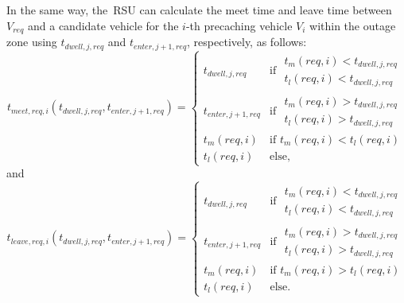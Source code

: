 \documentclass[electronics,aricle,accept,pdftex,moreauthors]{Definitions/mdpi}
\begin{document}
In the same way, the~RSU can calculate the meet time and leave time between $V_{req}$ and a candidate vehicle for the $i$-th precaching vehicle $V_{i}$ within the outage zone using $t_{dwell,j,req}$ and $t_{enter,j+1,req}$, respectively, as follows:
\begin{equation}
    t_{meet,req,i}(t_{dwell,j,req}, t_{enter,j+1,req}) = \begin{cases}
        t_{dwell,j,req} & \text{if } \begin{split}
                                        t_{m}(req,i) < t_{dwell,j,req} \\
                                        t_{l}(req,i) < t_{dwell,j,req}
                                    \end{split}\\
        t_{enter,j+1,req} & \text{if } \begin{split}
                                        t_{m}(req,i) > t_{dwell,j,req} \\
                                        t_{l}(req,i) > t_{dwell,j,req}
                                    \end{split}\\
        t_{m}(req,i) & \text{if } t_{m}(req,i) < t_{l}(req,i)\\
        t_{l}(req,i) & \text{else,}
    \end{cases}
\end{equation}
and
\begin{equation}
    t_{leave,req,i}(t_{dwell,j,req}, t_{enter,j+1,req}) = \begin{cases}
        t_{dwell,j,req} & \text{if } \begin{split}
                                        t_{m}(req,i) < t_{dwell,j,req} \\
                                        t_{l}(req,i) < t_{dwell,j,req}
                                    \end{split}\\
        t_{enter,j+1,req} & \text{if } \begin{split}
                                        t_{m}(req,i) > t_{dwell,j,req} \\
                                        t_{l}(req,i) > t_{dwell,j,req}
                                    \end{split}\\
        t_{m}(req,i) & \text{if } t_{m}(req,i) > t_{l}(req,i)\\
        t_{l}(req,i) & \text{else.}
    \end{cases}
\end{equation}
\end{document}
